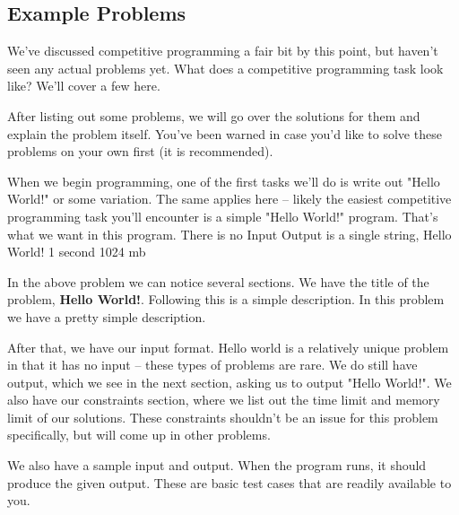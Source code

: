 \subsection{Example Problems}

We've discussed competitive programming a fair bit by this point, but haven't seen any actual problems yet. What does a competitive programming task look like? We'll cover a few here.

After listing out some problems, we will go over the solutions for them and explain the problem itself. You've been warned in case you'd like to solve these problems on your own first (it is recommended).

\hrulefill

{When we begin programming, one of the first tasks we'll do is write out "Hello World!" or some variation. The same applies here -- likely the easiest competitive programming task you'll encounter is a simple "Hello World!" program. That's what we want in this program.}
{There is no Input}
{Output is a single string, Hello World!}
{1 second}
{1024 mb}
{}

\hrulefill

In the above problem we can notice several sections. We have the title of the problem, \textbf{Hello World!}. Following this is a simple description. In this problem we have a pretty simple description.

After that, we have our input format. Hello world is a relatively unique problem in that it has no input -- these types of problems are rare. We do still have output, which we see in the next section, asking us to output "Hello World!". We also have our constraints section, where we list out the time limit and memory limit of our solutions. These constraints shouldn't be an issue for this problem specifically, but will come up in other problems.

We also have a sample input and output. When the program runs, it should produce the given output. These are basic test cases that are readily available to you.

\hrulefill

